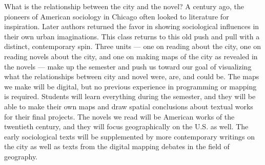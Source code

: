 What is the relationship between the city and the novel? A century ago, the
pioneers of American sociology in Chicago often looked to literature for
inspiration. Later authors returned the favor in showing sociological
influences in their own urban imaginations. This class returns to this old push
and pull with a distinct, contemporary spin. Three units — one on reading about
the city, one on reading novels about the city, and one on making maps of the
city as revealed in the novels — make up the semester and push us toward our
goal of visualizing what the relationships between city and novel were, are,
and could be. The maps we make will be digital, but no previous experience in
programming or mapping is required. Students will learn everything during the
semester, and they will be able to make their own maps and draw spatial
conclusions about textual works for their final projects. The novels we read
will be American works of the twentieth century, and they will focus
geographically on the U.S. as well. The early sociological texts will be
supplemented by more contemporary writings on the city as well as texts from
the digital mapping debates in the field of geography. 
